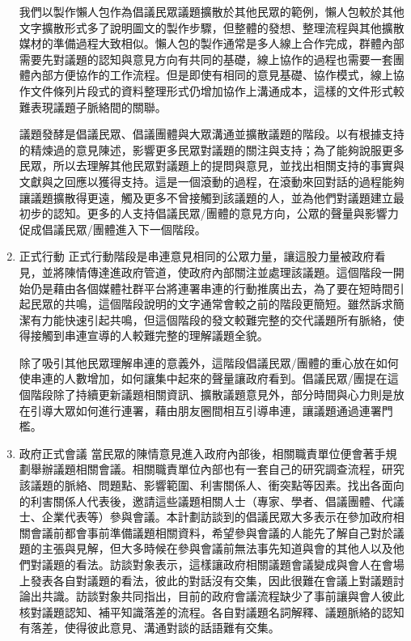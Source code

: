 \documentclass[12pt,a4paper]{article}
\begin{document}
\begin{enumerate}
我們以製作懶人包作為倡議民眾議題擴散於其他民眾的範例，懶人包較於其他文字擴散形式多了說明圖文的製作步驟，但整體的發想、整理流程與其他擴散媒材的準備過程大致相似。懶人包的製作通常是多人線上合作完成，群體內部需要先對議題的認知與意見方向有共同的基礎，線上協作的過程也需要一套團體內部方便協作的工作流程。但是即使有相同的意見基礎、協作模式，線上協作文件條列片段式的資料整理形式仍增加協作上溝通成本，這樣的文件形式較難表現議題子脈絡間的關聯。

議題發酵是倡議民眾、倡議團體與大眾溝通並擴散議題的階段。以有根據支持的精煉過的意見陳述，影響更多民眾對議題的關注與支持；為了能夠說服更多民眾，所以去理解其他民眾對議題上的提問與意見，並找出相關支持的事實與文獻與之回應以獲得支持。這是一個滾動的過程，在滾動來回對話的過程能夠讓議題擴散得更遠，觸及更多不曾接觸到該議題的人，並為他們對議題建立最初步的認知。更多的人支持倡議民眾/團體的意見方向，公眾的聲量與影響力促成倡議民眾/團體進入下一個階段。
\item 正式行動
\label{sec:org096bc67}
正式行動階段是串連意見相同的公眾力量，讓這股力量被政府看見，並將陳情傳達進政府管道，使政府內部關注並處理該議題。這個階段一開始仍是藉由各個媒體社群平台將連署串連的行動推廣出去，為了要在短時間引起民眾的共鳴，這個階段說明的文字通常會較之前的階段更簡短。雖然訴求簡潔有力能快速引起共鳴，但這個階段的發文較難完整的交代議題所有脈絡，使得接觸到串連宣導的人較難完整的理解議題全貌。

除了吸引其他民眾理解串連的意義外，這階段倡議民眾/團體的重心放在如何使串連的人數增加，如何讓集中起來的聲量讓政府看到。倡議民眾/團提在這個階段除了持續更新議題相關資訊、擴散議題意見外，部分時間與心力則是放在引導大眾如何進行連署，藉由朋友圈間相互引導串連，讓議題通過連署門檻。
\item 政府正式會議
\label{sec:org79971cc}
當民眾的陳情意見進入政府內部後，相關職責單位便會著手規劃舉辦議題相關會議。相關職責單位內部也有一套自己的研究調查流程，研究該議題的脈絡、問題點、影響範圍、利害關係人、衝突點等因素。找出各面向的利害關係人代表後，邀請這些議題相關人士（專家、學者、倡議團體、代議士、企業代表等）參與會議。本計劃訪談到的倡議民眾大多表示在參加政府相關會議前都會事前準備議題相關資料，希望參與會議的人能先了解自己對於議題的主張與見解，但大多時候在參與會議前無法事先知道與會的其他人以及他們對議題的看法。訪談對象表示，這樣讓政府相關議題會議變成與會人在會場上發表各自對議題的看法，彼此的對話沒有交集，因此很難在會議上對議題討論出共識。訪談對象共同指出，目前的政府會議流程缺少了事前讓與會人彼此核對議題認知、補平知識落差的流程。各自對議題名詞解釋、議題脈絡的認知有落差，使得彼此意見、溝通對談的話語難有交集。


\end{enumerate}
\end{document}
